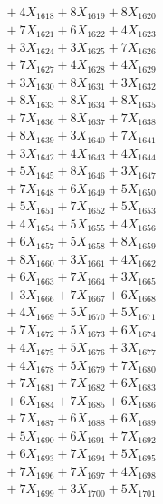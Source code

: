 \documentclass[a4paper,10pt]{article}
\begin{document}
{\begin{align}
&\;  + 4 X_{1618} + 8 X_{1619} + 8 X_{1620} \\[0.3ex]
&\;  + 7 X_{1621} + 6 X_{1622} + 4 X_{1623} \\[0.3ex]
&\;  + 3 X_{1624} + 3 X_{1625} + 7 X_{1626} \\[0.3ex]
&\;  + 7 X_{1627} + 4 X_{1628} + 4 X_{1629} \\[0.5ex]\allowbreak
&\;  + 3 X_{1630} + 8 X_{1631} + 3 X_{1632} \\[0.3ex]
&\;  + 8 X_{1633} + 8 X_{1634} + 8 X_{1635} \\[0.3ex]
&\;  + 7 X_{1636} + 8 X_{1637} + 7 X_{1638} \\[0.3ex]
&\;  + 8 X_{1639} + 3 X_{1640} + 7 X_{1641} \\[0.3ex]
&\;  + 3 X_{1642} + 4 X_{1643} + 4 X_{1644} \\[0.3ex]
&\;  + 5 X_{1645} + 8 X_{1646} + 3 X_{1647} \\[0.3ex]
&\;  + 7 X_{1648} + 6 X_{1649} + 5 X_{1650} \\[0.3ex]
&\;  + 5 X_{1651} + 7 X_{1652} + 5 X_{1653} \\[0.3ex]
&\;  + 4 X_{1654} + 5 X_{1655} + 4 X_{1656} \\[0.3ex]
&\;  + 6 X_{1657} + 5 X_{1658} + 8 X_{1659} \\[0.5ex]\allowbreak
&\;  + 8 X_{1660} + 3 X_{1661} + 4 X_{1662} \\[0.3ex]
&\;  + 6 X_{1663} + 7 X_{1664} + 3 X_{1665} \\[0.3ex]
&\;  + 3 X_{1666} + 7 X_{1667} + 6 X_{1668} \\[0.3ex]
&\;  + 4 X_{1669} + 5 X_{1670} + 5 X_{1671} \\[0.3ex]
&\;  + 7 X_{1672} + 5 X_{1673} + 6 X_{1674} \\[0.3ex]
&\;  + 4 X_{1675} + 5 X_{1676} + 3 X_{1677} \\[0.3ex]
&\;  + 4 X_{1678} + 5 X_{1679} + 7 X_{1680} \\[0.3ex]
&\;  + 7 X_{1681} + 7 X_{1682} + 6 X_{1683} \\[0.3ex]
&\;  + 6 X_{1684} + 7 X_{1685} + 6 X_{1686} \\[0.3ex]
&\;  + 7 X_{1687} + 6 X_{1688} + 6 X_{1689} \\[0.5ex]\allowbreak
&\;  + 5 X_{1690} + 6 X_{1691} + 7 X_{1692} \\[0.3ex]
&\;  + 6 X_{1693} + 7 X_{1694} + 5 X_{1695} \\[0.3ex]
&\;  + 7 X_{1696} + 7 X_{1697} + 4 X_{1698} \\[0.3ex]
&\;  + 7 X_{1699} + 3 X_{1700} + 5 X_{1701} \\[0.3ex]

\end{align}}
\end{document}

